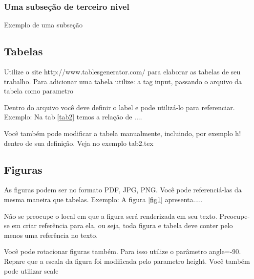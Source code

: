 \documentclass[	DIV=calc,%
							paper=a4,%
							fontsize=12pt,%
							onecolumn]{scrartcl}	 					%
\begin{document}
\subsubsection{Uma subseção de terceiro nivel}

Exemplo de uma subseção

\subsection{Tabelas}

Utilize o site http://www.tablesgenerator.com/ para elaborar as tabelas de seu trabalho.
Para adicionar uma tabela utilize: a tag input, passando o arquivo da tabela como parametro



Dentro do arquivo você deve definir o label e pode utilizá-lo para referenciar. Exemplo:
Na tab \ref{tab2} temos a relação de ....


Você também pode modificar a tabela manualmente, incluindo, por exemplo h! dentro de sua definição. Veja no exemplo tab2.tex

\subsection{Figuras}

As figuras podem ser no formato PDF, JPG, PNG. Você pode referenciá-las da mesma maneira que tabelas. Exemplo: A figura \ref{fig1} apresenta.....

Não se preocupe o local em que a figura será renderizada em seu texto. Preocupe-se em criar referência para ela, ou seja, toda figura e tabela deve conter pelo menos uma referência no texto.

Você pode rotacionar figuras também. Para isso utilize o parâmetro angle=-90. Repare que a escala da figura foi modificada pelo parametro height. Você também pode utilizar scale
\end{document}
